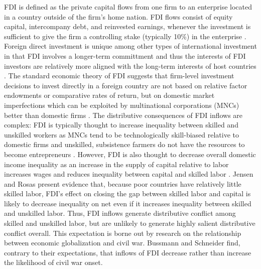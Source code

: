 \documentclass[12pt,a4paper]{article}\usepackage[]{graphicx}\usepackage[]{color}
\begin{document}
FDI is defined as the private capital flows from one firm to an enterprise located in a country outside of the firm's home nation. FDI flows consist of equity capital, intercompany debt, and reinvested earnings, whenever the investment is sufficient to give the firm a controlling stake (typically 10\%) in the enterprise \parencites[9]{DirectInvestmentTechnicalExpertGroupDITEG:2004wa}[588]{Jensen:2003to}. Foreign direct investment is unique among other types of international investment in that FDI involves a longer-term committment and thus the interests of FDI investors are relatively more aligned with the long-term interests of host countries \parencites{Lipsey:1999tn}[588]{Jensen:2003to}. The standard economic theory of FDI suggests that firm-level investment decisions to invest directly in a foreign country are not based on relative factor endowments or comparative rates of return, but on domestic market imperfections which can be exploited by multinational corporations (MNCs) better than domestic firms \parencites{Hymer:1960vo}{dunning2013international}. The distributive consequences of FDI inflows are complex: FDI is typically thought to increase inequality between skilled and unskilled workers as MNCs tend to be technologically skill-biased relative to domestic firms \parencite{Feenstra:1997kx} and unskilled, subsistence farmers do not have the resources to become entrepreneurs \parencite{Basu:2007ir}. However, FDI is also thought to decrease overall domestic income inequality as an increase in the supply of capital relative to labor increases wages and reduces inequality between capital and skilled labor \parencite{Jensen:2007fr}. Jensen and Rosas present evidence that, because poor countries have relatively little skilled labor, FDI's effect on closing the gap between skilled labor and capital is likely to decrease inequality on net even if it increases inequality between skilled and unskilled labor. Thus, FDI inflows generate distributive conflict among skilled and unskilled labor, but are unlikely to generate highly salient distributive conflict overall. This expectation is borne out by research on the relationship between economic globalization and civil war. Bussmann and Schneider \parencite*{Bussmann:2007vx} find, contrary to their expectations, that inflows of FDI decrease rather than increase the likelihood of civil war onset.
\end{document}
